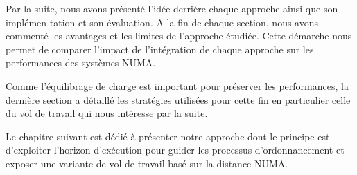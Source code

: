 Par la suite, nous avons présenté l'idée derrière chaque approche ainsi que son implémen-tation et son évaluation. A la fin de chaque section, nous avons commenté les avantages et les limites de l’approche étudiée. Cette démarche nous permet de comparer l'impact de l'intégration  de chaque approche sur les performances des systèmes NUMA. 

Comme l'équilibrage de charge est important pour préserver les performances, la dernière section a détaillé les stratégies utilisées pour cette fin en particulier celle du vol de travail qui nous intéresse par la suite.

Le chapitre suivant est dédié à présenter notre approche dont le principe est d'exploiter l'horizon d'exécution pour guider les processus d'ordonnancement et exposer une variante de vol de travail basé sur la distance NUMA.